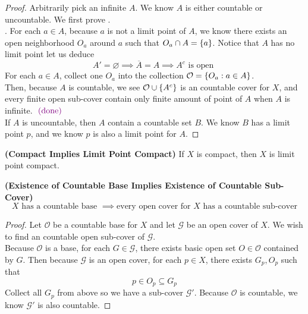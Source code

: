 \documentclass{report}
\begin{document}
\begin{proof}
Arbitrarily pick an infinite $A$. We know  $A$ is either countable or uncountable. We first prove  .\\

. For each $a\in A$, because $a$ is not a limit point of $A$, we know there exists an open neighborhood  $O_a$ around $a$ such that  $O_a\cap A=\{ a \}$. Notice that $A$ has no limit point let us deduce
\begin{equation}
A'=\varnothing \implies \overline{A}=A\implies A^c\text{ is open }
\end{equation}
For each $a\in A$, collect one $O_a$ into the collection $\mathcal{O}=\{ O_a:a\in A \}$.\\

Then, because $A$ is countable, we see $\mathcal{O}\cup \{ A^c \}$ is an countable cover for $X$, and every finite open sub-cover contain only finite amount of point of $A$ when  $A$ is infinite. \CaC $\textcolor{violet}{\text{ (done) }}$\\

If $A$ is uncountable, then  $A$ contain a countable set  $B$. We know  $B$ has a limit point  $p$, and we know  $p$ is also a limit point for $A$.
\end{proof}
\begin{corollary}
\label{2.3.8}
\textbf{(Compact Implies Limit Point Compact)} If $X$ is compact, then $X$ is limit point compact.
\end{corollary}
\begin{theorem}
\label{2.3.9}
\textbf{(Existence of Countable Base Implies Existence of Countable Sub-Cover)} 
\begin{equation}
X\text{ has a countable base }\implies\text{every open cover for $X$ has a countable sub-cover}
\end{equation}
\end{theorem}
\begin{proof}
Let $\mathcal{O}$ be a countable base for $X$ and let $\mathcal{G}$ be an open cover of $X$. We wish to find an countable open sub-cover of $\mathcal{G}$.\\

Because $\mathcal{O}$ is a base, for each $G\in \mathcal{G}$, there exists basic open set $O\in \mathcal{O}$ contained by $G$. Then because  $\mathcal{G}$ is an open cover, for each $p\in X$, there exists $G_p,O_p$ such that
\begin{equation}
p\in O_p\subseteq G_p
\end{equation}
Collect all $G_p$ from above so we have a sub-cover $\mathcal{G}'$. Because $\mathcal{O}$ is countable, we know $\mathcal{G}'$ is also countable.
\end{proof}
\end{document}
